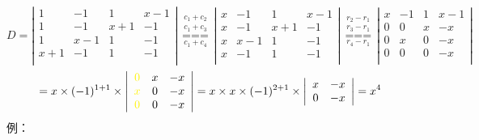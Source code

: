 $$
D=\left|
\begin{array}{cccc}
    1   & -1  & 1   & x-1 \\
    1   & -1  & x+1 & -1  \\    
    1   & x-1 & 1   & -1  \\    
    x+1 & -1  & 1   & -1  \\
\end{array}\right|
\underset{{{c}_{1}}+{{c}_{4}}}{\overset{
    \begin{smallmatrix} 
    {{c}_{1}}+{{c}_{2}} \\ 
    {{c}_{1}}+{{c}_{3}} 
   \end{smallmatrix}}{\mathop{===}}}\left| 
   \begin{matrix}
      x & -1 & 1 & x-1  \\
      x & -1 & x+1 & -1  \\
      x & x-1 & 1 & -1  \\
      x & -1 & 1 & -1  \\
   \end{matrix} \right|
\underset{{{r}_{4}}-{{r}_{1}}}{\overset{
\begin{smallmatrix} 
{{r}_{2}}-{{r}_{1}} \\ 
{{r}_{3}}-{{r}_{1}} 
\end{smallmatrix}}{\mathop{===}}}
\left| 
\begin{matrix}
    x & -1 & 1 & x-1  \\
    0 & 0 & x & -x  \\
    0 & x & 0 & -x  \\
    0 & 0 & 0 & -x  \\
\end{matrix} \right|
$$$$
=x\times (-1)^{1+1} \times \left|
\begin{array}{ccc}
    {\color{yellow} 0} & x & -x \\
    {\color{yellow} x} & 0 & -x \\    
    {\color{yellow} 0} & 0 & -x \\
\end{array}\right|=x\times x \times (-1)^{2+1}\times\left|
\begin{array}{cc}
    x & -x \\
    0 & -x \\    
\end{array}\right|=x^{4}
$$
{\color{blue} 例：}
